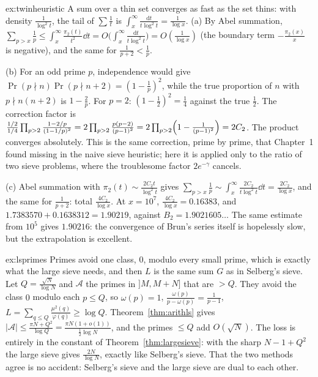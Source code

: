 \begin{solution}{ex:twinheuristic}
\idea A sum over a thin set converges as fast as the set thins: with density $\frac1{\log^2t}$, the tail of $\sum\frac1t$ is $\int_x^\infty\frac{\mathrm dt}{t\log^2t}=\frac1{\log x}$.
\writeup (a) By Abel summation, $\sum_{p>x}\frac1p\le\int_x^\infty\frac{\pi_2(t)}{t^2}\dd t=O\bigl(\int_x^\infty\frac{\mathrm dt}{t\log^2t}\bigr)=O(\frac1{\log x})$ (the boundary term $-\frac{\pi_2(x)}x$ is negative), and the same for $\frac1{p+2}<\frac1p$.

(b) For an odd prime $p$, independence would give $\Pr(p\nmid n)\Pr(p\nmid n+2)=(1-\frac1p)^2$, while the true proportion of $n$ with $p\nmid n(n+2)$ is $1-\frac2p$. For $p=2$: $(1-\frac12)^2=\frac14$ against the true $\frac12$. The
correction factor is $\frac{1/2}{1/4}\prod_{p>2}\frac{1-2/p}{(1-1/p)^2}=2\prod_{p>2}\frac{p(p-2)}{(p-1)^2}=2\prod_{p>2}\Bigl(1-\frac1{(p-1)^2}\Bigr)=2C_2$. The product converges absolutely. This is the same
correction, prime by prime, that Chapter~1 found missing in the naive sieve heuristic; here it is applied only to the ratio of two sieve problems, where the troublesome factor $2e^{-\gamma}$ cancels.

(c) Abel summation with $\pi_2(t)\sim\frac{2C_2t}{\log^2t}$ gives $\sum_{p>x}\frac1p\sim\int_x^\infty\frac{2C_2}{t\log^2t}\dd t=\frac{2C_2}{\log x}$, and the same for $\frac1{p+2}$: total $\frac{4C_2}{\log x}$. At $x=10^7$, $\frac{4C_2}{\log x}=0.16383$, and
$1.7383570+0.1638312=1.90219$, against $B_2=1.9021605\ldots$ The same estimate from $10^5$ gives $1.90216$: the convergence of Brun's series itself is hopelessly slow, but the extrapolation is excellent.
\end{solution}

\begin{solution}{ex:lsprimes}
\idea Primes avoid one class, $0$, modulo every small prime, which is exactly what the large sieve needs, and then $L$ is the same sum $G$ as in Selberg's sieve.
\writeup Let $Q=\frac{\sqrt N}{\log N}$ and $\mathcal A$ the primes in $]M,M+N]$ that are $>Q$. They avoid the class $0$ modulo each $p\le Q$, so $\omega(p)=1$, $\frac{\omega(p)}{p-\omega(p)}=\frac1{p-1}$, $L=\sum_{q\le Q}\frac{\mu^2(q)}{\varphi(q)}\ge\log Q$. Theorem~\ref{thm:arithls} gives
$|\mathcal A|\le\frac{\pi N+Q^2}{\log Q}=\frac{\pi N(1+o(1))}{\frac12\log N}$, and the primes $\le Q$ add $O(\sqrt N)$. The loss is entirely in the constant of Theorem~\ref{thm:largesieve}: with the sharp $N-1+Q^2$ the large sieve gives $\frac{2N}{\log N}$,
exactly like Selberg's sieve. That the two methods agree is no accident: Selberg's sieve and the large sieve are dual to each other.
\end{solution}

